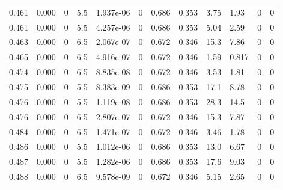 \documentclass[preview]{standalone}
\begin{document}
{{{\begin{tabular}{L{1.2cm}C{1.2cm} C{0.3cm}C{0.5cm} C{1.4cm}C{1.4cm} C{1.4cm}C{1.4cm} C{1.6cm}C{1.6cm} C{1.6cm}C{1.6cm}}
  0.461  &  0.000  & 0     & 5.5 &  1.937e-06  & 0  &  0.686&   0.353& 3.75 & 1.93   &  0 & 0  \\ 
  0.461  &  0.000  & 0     & 5.5 &  4.257e-06  & 0  &  0.686&   0.353& 5.04 & 2.59   &  0 & 0  \\ 
  0.463  &  0.000  & 0     & 6.5 &  2.067e-07  & 0  &  0.672&   0.346& 15.3 & 7.86   &  0 & 0  \\ 
  0.465  &  0.000  & 0     & 6.5 &  4.916e-07  & 0  &  0.672&   0.346& 1.59 & 0.817   &  0 & 0  \\ 
  0.474  &  0.000  & 0     & 6.5 &  8.835e-08  & 0  &  0.672&   0.346& 3.53 & 1.81   &  0 & 0  \\ 
  0.475  &  0.000  & 0     & 5.5 &  8.383e-09  & 0  &  0.686&   0.353& 17.1 & 8.78   &  0 & 0  \\ 
  0.476  &  0.000  & 0     & 5.5 &  1.119e-08  & 0  &  0.686&   0.353& 28.3 & 14.5   &  0 & 0  \\ 
  0.476  &  0.000  & 0     & 6.5 &  2.807e-07  & 0  &  0.672&   0.346& 15.3 & 7.87   &  0 & 0  \\ 
  0.484  &  0.000  & 0     & 6.5 &  1.471e-07  & 0  &  0.672&   0.346& 3.46 & 1.78   &  0 & 0  \\ 
  0.486  &  0.000  & 0     & 5.5 &  1.012e-06  & 0  &  0.686&   0.353& 13.0 & 6.67   &  0 & 0  \\ 
  0.487  &  0.000  & 0     & 5.5 &  1.282e-06  & 0  &  0.686&   0.353& 17.6 & 9.03   &  0 & 0  \\ 
  0.488  &  0.000  & 0     & 6.5 &  9.578e-09  & 0  &  0.672&   0.346& 5.15 & 2.65   &  0 & 0  \\ 
\hline 
\end{tabular} 

}}}
\end{document}
